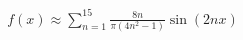 \documentclass[preview]{standalone}
\begin{document}
\begin{align*}
f(x) \approx \sum_{n=1}^{15} \frac{8n}{\pi(4n^2-1)} \sin(2nx)
\end{align*}
\end{document}
